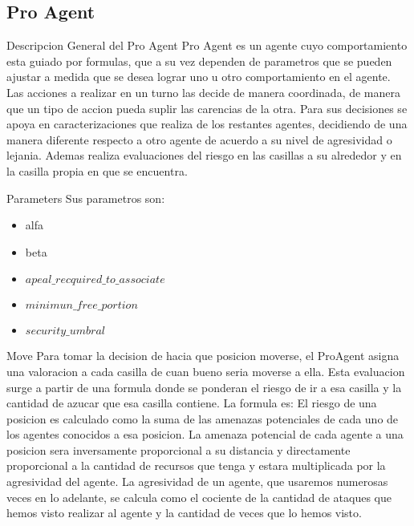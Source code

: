 \documentclass{beamer}
\begin{document}
\subsection{Pro Agent}
\begin{frame}{Descripcion General del Pro Agent}
    Pro Agent es un agente cuyo comportamiento esta guiado por formulas, que a su vez dependen de parametros que se pueden ajustar a medida que se desea lograr uno u otro comportamiento en el agente.
    Las acciones a realizar en un turno las decide de manera coordinada, de manera que un tipo de accion pueda suplir las carencias de la otra.
    Para sus decisiones se apoya en caracterizaciones que realiza de los restantes agentes, decidiendo de una manera diferente respecto a otro agente de acuerdo a su nivel de agresividad o lejania. Ademas realiza evaluaciones del riesgo en las casillas a su alrededor y en la casilla propia en que se encuentra.
\end{frame}

\begin{frame}{Parameters}
    Sus parametros son:
    \begin{itemize}
        \item alfa
        \item beta
        \item $apeal\_recquired\_to\_associate$
        \item $minimun\_free\_portion$
        \item $security\_umbral$
    \end{itemize}
\end{frame}

\begin{frame}{Move}
    Para tomar la decision de hacia que posicion moverse, el ProAgent asigna una valoracion a cada casilla de cuan bueno seria moverse a ella. Esta evaluacion surge a partir de una formula donde se ponderan el riesgo de ir a esa casilla y la cantidad de azucar que esa casilla contiene.
    La formula es:
    El riesgo de una posicion es calculado como la suma de las amenazas potenciales de cada uno de los agentes conocidos a esa posicion. La amenaza potencial de cada agente a una posicion sera inversamente proporcional a su distancia y directamente proporcional a la cantidad de recursos que tenga y estara multiplicada por la agresividad del agente.
    La agresividad de un agente, que usaremos numerosas veces en lo adelante, se calcula como el cociente de la cantidad de ataques que hemos visto realizar al agente y la cantidad de veces que lo hemos visto.
\end{frame}
\end{document}
